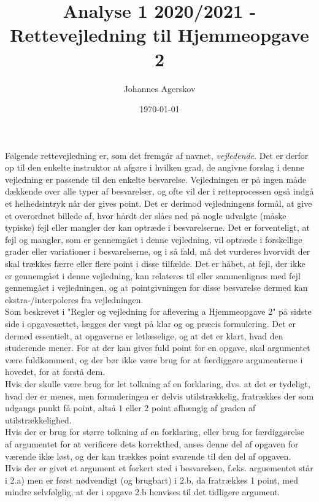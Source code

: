 \documentclass{article}
\title{Analyse 1 2020/2021 - Rettevejledning til Hjemmeopgave 2}
\author{Johannes Agerskov}
\date{\today}
\begin{document}
	
	\maketitle
Følgende rettevejledning er, som det fremgår af navnet, \emph{vejledende}. Det er derfor op til den enkelte instruktor at afgøre i hvilken grad, de angivne forslag i denne vejledning er passende til den enkelte besvarelse. Vejledningen er på ingen måde dækkende over alle typer af besvarelser, og ofte vil der i retteprocessen også indgå et helhedsintryk når der gives point. Det er derimod vejledningens formål, at give et overordnet billede af, hvor hårdt der slåes ned på nogle udvalgte (måske typiske) fejl eller mangler der kan optræde i besvarelserne. Det er forventeligt, at fejl og mangler, som er gennemgået i denne vejledning, vil optræde i forskellige grader eller variationer i besvarelserne, og i så fald, må det vurderes hvorvidt der skal trækkes færre eller flere point i disse tilfælde. Det er håbet, at fejl, der ikke er gennemgået i denne vejledning, kan relateres til eller sammenlignes med fejl gennemgået i vejledningen, og at pointgivningen for disse besvarelse dermed kan ekstra-/interpoleres fra vejledningen.
\vspace*{0.5cm}\\
Som beskrevet i "Regler og vejledning for aflevering a Hjemmeopgave 2" på sidste side i opgavesættet, lægges der vægt på klar og og præcis formulering. Det er dermed essentielt, at opgaverne er letlæselige, og at det er klart, hvad den studerende mener. For at der kan gives fuld point for en opgave, skal argumentet være fuldkomment, og der bør ikke være brug for at færdiggøre argumenterne i hovedet, for at forstå dem.
\vspace*{0.2cm}
\\
Hvis der skulle være brug for let tolkning af en forklaring, dvs. at det er tydeligt, hvad der er menes, men formuleringen er delvis utilstrækkelig, fratrækkes der som udgangs punkt få point, altså $ 1 $ eller $ 2 $ point afhængig af graden af utilstrækkelighed.
\vspace*{0.2cm}\\
Hvis der er brug for større tolkning af en forklaring, eller brug for færdiggørelse af argumentet for at verificere dets korrekthed, anses denne del af opgaven for værende ikke løst, og der kan trækkes point svarende til den del af opgaven.
\vspace*{0.2cm}\\
Hvis der er givet et argument et forkert sted i besvarelsen, f.eks. arguementet står i 2.a) men er først nødvendigt (og brugbart) i 2.b, da fratrækkes 1 point, med mindre selvfølglig, at der i opgave 2.b henvises til det tidligere argument.
\end{document}
